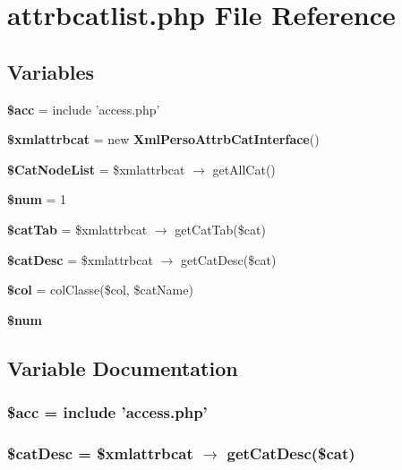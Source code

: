 \section{attrbcatlist.php File Reference}
\label{attrbcatlist_8php}


\subsection*{Variables}
\begin{CompactItemize}
\item 
{\bf \$acc} = include 'access.php'
\item 
{\bf \$xmlattrbcat} = new {\bf Xml\-Perso\-Attrb\-Cat\-Interface}()
\item 
{\bf \$Cat\-Node\-List} = \$xmlattrbcat $\rightarrow$ get\-All\-Cat()
\item 
{\bf \$num} = 1
\item 
{\bf \$cat\-Tab} = \$xmlattrbcat $\rightarrow$ get\-Cat\-Tab(\$cat)
\item 
{\bf \$cat\-Desc} = \$xmlattrbcat $\rightarrow$ get\-Cat\-Desc(\$cat)
\item 
{\bf \$col} = col\-Classe(\$col, \$cat\-Name)
\item 
{\bf \$num}
\end{CompactItemize}


\subsection{Variable Documentation}
\subsubsection{\setlength{\rightskip}{0pt plus 5cm}\$acc = include 'access.php'}\label{attrbcatlist_8php_542926c588a05eb69553d79c83cf73da}


\subsubsection{\setlength{\rightskip}{0pt plus 5cm}\$cat\-Desc = \$xmlattrbcat $\rightarrow$ get\-Cat\-Desc(\$cat)}\label{attrbcatlist_8php_49fde5ca82daa0856a2f0e811e7f54d8}


